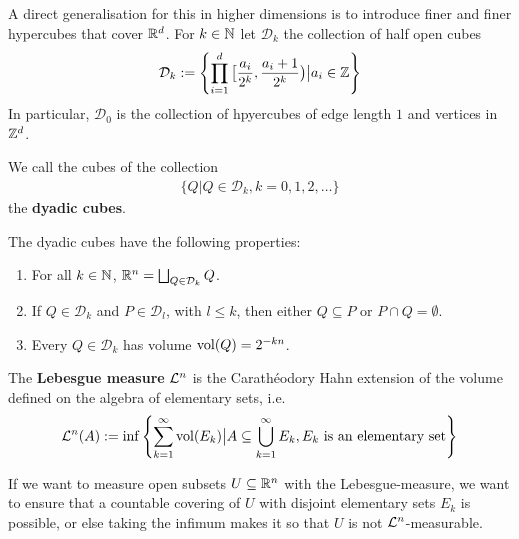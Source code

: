 A direct generalisation for this in higher dimensions is to introduce finer and finer hypercubes that cover $\mathbb{R}^{d}$.
For $k \in \mathbb{N}$ let $\mathcal{D}_k$ the collection of half open cubes
\begin{align*}
  \mathcal{D}_k := \left\{
  \prod_{i=1}^{d}\big[\frac{a_i}{2^{k}}, \frac{a_{i}+1}{2^{k}}\big) \big\vert a_i \in \mathbb{Z}
  \right\}
\end{align*}  
In particular, $\mathcal{D}_0$ is the collection of hpyercubes of edge length $1$ and vertices in $\mathbb{Z}^d$.

We call the cubes of the collection
\begin{align*}
  \{Q \big\vert Q \in \mathcal{D}_k, k = 0,1,2, \ldots\}
\end{align*}
the \textbf{dyadic cubes}.

\begin{rem}
The dyadic cubes have the following properties:
\begin{enumerate}
  \item For all $k \in \mathbb{N}$, $\mathbb{R}^{n} = \bigsqcup_{Q \in \mathcal{D}_k}Q$.
  \item If $Q \in \mathcal{D}_k$ and $P \in \mathcal{D}_l$, with $l \leq k$, then either $Q \subseteq P$ or $P \cap Q = \emptyset$.
  \item Every $Q \in \mathcal{D}_k$ has volume $\operatorname{vol}(Q) = 2^{-kn}$.
\end{enumerate}
\end{rem}


\begin{dfn}[]
The \textbf{Lebesgue measure} $\mathcal{L}^{n}$ is the Carathéodory Hahn extension of the volume defined on the algebra of elementary sets, i.e.
\begin{align*}
  \mathcal{L}^{n}(A) := \inf \left\{
    \sum_{k=1}^{\infty} \operatorname{vol}(E_k) \big\vert A \subseteq \bigcup_{k=1}^{\infty} E_k, E_k \text{ is an elementary set}
  \right\}
\end{align*}
\end{dfn}

If we want to measure open subsets $U \subseteq \mathbb{R}^{n}$ with the Lebesgue-measure, we want to ensure that a countable covering of $U$ with disjoint elementary sets $E_k$ is possible, or else taking the infimum makes it so that $U$ is not $\mathcal{L}^{n}$-measurable.

